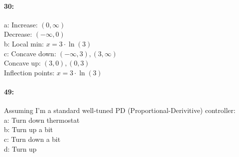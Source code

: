 \documentclass[12pt]{article}
\begin{document}
    \paragraph*{30:\\}
            a: Increase: $(0, \infty)$\\Decrease: $(-\infty, 0)$\\
            b: Local min: $x = 3\cdot\ln(3)$\\
            c: Concave down: $(-\infty, 3), (3, \infty)$\\Concave up: $(3, 0), (0, 3)$\\
            Inflection points: $x = 3\cdot\ln(3)$\\

    \paragraph*{49:\\}
                Assuming I'm a standard well-tuned PD (Proportional-Derivitive) controller:\\
            a: Turn down thermostat\\
            b: Turn up a bit\\
            c: Turn down a bit \\
            d: Turn up\\
\thispagestyle{fancy}
\end{document}
